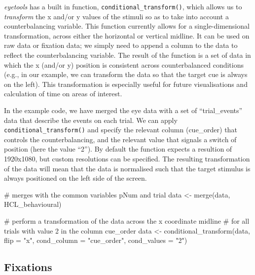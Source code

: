 \documentclass[
  man,
  floatsintext,
  longtable,
  nolmodern,
  notxfonts,
  notimes,
  colorlinks=true,linkcolor=blue,citecolor=blue,urlcolor=blue]{apa7}
\newenvironment{Shaded}{\begin{snugshade}}{\end{snugshade}}
\newcommand{\AttributeTok}[1]{\textcolor[rgb]{0.40,0.45,0.13}{#1}}
\newcommand{\CommentTok}[1]{\textcolor[rgb]{0.37,0.37,0.37}{#1}}
\newcommand{\FunctionTok}[1]{\textcolor[rgb]{0.28,0.35,0.67}{#1}}
\newcommand{\NormalTok}[1]{\textcolor[rgb]{0.00,0.23,0.31}{#1}}
\newcommand{\OtherTok}[1]{\textcolor[rgb]{0.00,0.23,0.31}{#1}}
\newcommand{\StringTok}[1]{\textcolor[rgb]{0.13,0.47,0.30}{#1}}
\begin{document}
\emph{eyetools} has a built in function,
\texttt{conditional\_transform()}, which allows us to \emph{transform}
the x and/or y values of the stimuli so as to take into account a
counterbalancing variable. This function currently allows for a
single-dimensional transformation, across either the horizontal or
vertical midline. It can be used on raw data or fixation data; we simply
need to append a column to the data to reflect the counterbalancing
variable. The result of the function is a set of data in which the x
(and/or y) position is consistent across counterbalanced conditions
(e.g., in our example, we can transform the data so that the target cue
is always on the left). This transformation is especially useful for
future visualisations and calculation of time on areas of interest.

In the example code, we have merged the eye data with a set of
``trial\_events'' data that describe the events on each trial. We can
apply \texttt{conditional\_transform()} and specify the relevant column
(cue\_order) that controls the counterbalancing, and the relevant value
that signals a switch of position (here the value ``2''). By default the
function expects a resultion of 1920x1080, but custom resolutions can be
specified. The resulting transformation of the data will mean that the
data is normalised such that the target stimulus is always positioned on
the left side of the screen.

\begin{Shaded}
\begin{Highlighting}[]
\CommentTok{\# merges with the common variables pNum and trial}
\NormalTok{data }\OtherTok{\textless{}{-}} \FunctionTok{merge}\NormalTok{(data, HCL\_behavioural) }

\CommentTok{\# perform a transformation of the data across the x coordinate midline}
\CommentTok{\# for all trials with value 2 in the column cue\_order}
\NormalTok{data }\OtherTok{\textless{}{-}} \FunctionTok{conditional\_transform}\NormalTok{(data, }
                              \AttributeTok{flip =} \StringTok{"x"}\NormalTok{, }
                              \AttributeTok{cond\_column =} \StringTok{"cue\_order"}\NormalTok{, }
                              \AttributeTok{cond\_values =} \StringTok{"2"}\NormalTok{) }
\end{Highlighting}
\end{Shaded}

\subsection{Fixations}\label{fixations}
\end{document}

